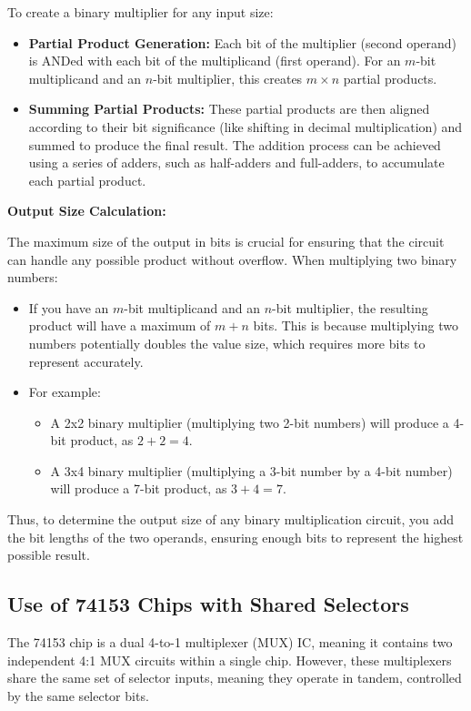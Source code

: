 \documentclass[12pt]{article}
\begin{document}
To create a binary multiplier for any input size:
\begin{itemize}
	\item \textbf{Partial Product Generation:} Each bit of the multiplier (second operand) is ANDed with each bit of the multiplicand (first operand). For an \( m \)-bit multiplicand and an \( n \)-bit multiplier, this creates \( m \times n \) partial products.
	\item \textbf{Summing Partial Products:} These partial products are then aligned according to their bit significance (like shifting in decimal multiplication) and summed to produce the final result. The addition process can be achieved using a series of adders, such as half-adders and full-adders, to accumulate each partial product.
\end{itemize}

\textbf{Output Size Calculation:}

The maximum size of the output in bits is crucial for ensuring that the circuit can handle any possible product without overflow. When multiplying two binary numbers:
\begin{itemize}
	\item If you have an \( m \)-bit multiplicand and an \( n \)-bit multiplier, the resulting product will have a maximum of \( m + n \) bits. This is because multiplying two numbers potentially doubles the value size, which requires more bits to represent accurately.
	\item For example:
	      \begin{itemize}
		      \item A 2x2 binary multiplier (multiplying two 2-bit numbers) will produce a 4-bit product, as \( 2 + 2 = 4 \).
		      \item A 3x4 binary multiplier (multiplying a 3-bit number by a 4-bit number) will produce a 7-bit product, as \( 3 + 4 = 7 \).
	      \end{itemize}
\end{itemize}

Thus, to determine the output size of any binary multiplication circuit, you add the bit lengths of the two operands, ensuring enough bits to represent the highest possible result.

\subsection*{Use of 74153 Chips with Shared Selectors}

The 74153 chip is a dual 4-to-1 multiplexer (MUX) IC, meaning it contains two independent 4:1 MUX circuits within a single chip. However, these multiplexers share the same set of selector inputs, meaning they operate in tandem, controlled by the same selector bits.
\end{document}
